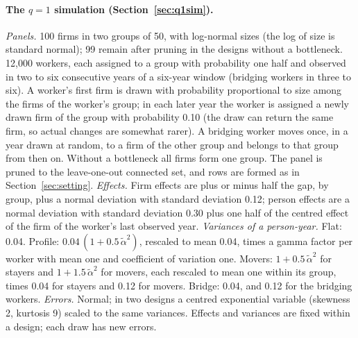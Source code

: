 \paragraph{The $q=1$ simulation (Section~\ref{sec:q1sim}).} \emph{Panels.} 100 firms in two groups of 50, with
log-normal sizes (the log of size is standard normal); 99 remain after pruning in the designs without a
bottleneck. 12,000 workers, each assigned to a group with
probability one half and observed in two to six consecutive years of a six-year window (bridging workers in
three to six). A worker's first firm is drawn with probability proportional to size among the firms of the
worker's group; in each later year the worker is assigned a newly drawn firm of the group with probability
0.10 (the draw can return the same firm, so actual changes are somewhat rarer). A bridging worker moves once, in a year drawn at random, to a firm of the other group and belongs to
that group from then on. Without a bottleneck all firms form one group. The panel is pruned to the
leave-one-out connected set, and rows are formed as in Section~\ref{sec:setting}.
\emph{Effects.} Firm effects are plus or minus half the gap, by group, plus a normal deviation with standard
deviation 0.12; person effects are a normal deviation with standard deviation 0.30 plus one half of the
centred effect of the firm of the worker's last observed year. \emph{Variances of a person-year.} Flat: 0.04. Profile:
$0.04\,(1+0.5\,\tilde\alpha^2)$, rescaled to mean 0.04, times a gamma factor per worker with mean one and
coefficient of variation one. Movers: $1+0.5\,\tilde\alpha^2$ for stayers and $1+1.5\,\tilde\alpha^2$ for movers,
each rescaled to mean one within its group, times 0.04 for stayers and 0.12 for movers. Bridge: 0.04, and 0.12
for the bridging workers. \emph{Errors.} Normal; in two designs a centred exponential variable (skewness 2,
kurtosis 9) scaled to the same variances. Effects and variances are fixed within a design; each draw has new
errors.

